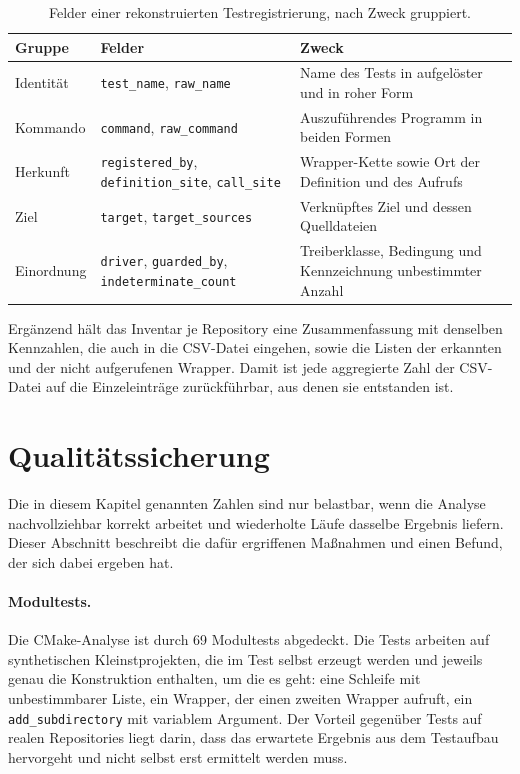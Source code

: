 \documentclass[12pt,a4paper,twoside,headsepline,parskip=half]{scrreprt}
\begin{document}
\begin{table}[H]
    \centering
    \small
    \begin{tabularx}{\textwidth}{l l X}
        \toprule
        \textbf{Gruppe} & \textbf{Felder} & \textbf{Zweck} \\
        \midrule
        Identität & \texttt{test\_name}, \texttt{raw\_name}
            & Name des Tests in aufgelöster und in roher Form \\
        Kommando & \texttt{command}, \texttt{raw\_command}
            & Auszuführendes Programm in beiden Formen \\
        Herkunft & \texttt{registered\_by}, \texttt{definition\_site},
                   \texttt{call\_site}
            & Wrapper-Kette sowie Ort der Definition und des Aufrufs \\
        Ziel & \texttt{target}, \texttt{target\_sources}
            & Verknüpftes Ziel und dessen Quelldateien \\
        Einordnung & \texttt{driver}, \texttt{guarded\_by},
                     \texttt{indeterminate\_count}
            & Treiberklasse, Bedingung und Kennzeichnung unbestimmter Anzahl \\
        \bottomrule
    \end{tabularx}
    \caption{Felder einer rekonstruierten Testregistrierung, nach Zweck gruppiert.}
    \label{tab:impl-datenmodell}
\end{table}

Ergänzend hält das Inventar je Repository eine Zusammenfassung mit denselben
Kennzahlen, die auch in die CSV-Datei eingehen, sowie die Listen der erkannten und der
nicht aufgerufenen Wrapper. Damit ist jede aggregierte Zahl der CSV-Datei auf die
Einzeleinträge zurückführbar, aus denen sie entstanden ist.

\label{sec:impl-ergebnis}
\section{Qualitätssicherung}
\label{sec:impl-qualitaet}

Die in diesem Kapitel genannten Zahlen sind nur belastbar, wenn die Analyse
nachvollziehbar korrekt arbeitet und wiederholte Läufe dasselbe Ergebnis liefern.
Dieser Abschnitt beschreibt die dafür ergriffenen Maßnahmen und einen Befund, der sich
dabei ergeben hat.

\paragraph{Modultests.}
Die CMake-Analyse ist durch 69 Modultests abgedeckt. Die Tests arbeiten auf
synthetischen Kleinstprojekten, die im Test selbst erzeugt werden und jeweils genau
die Konstruktion enthalten, um die es geht: eine Schleife mit unbestimmbarer Liste,
ein Wrapper, der einen zweiten Wrapper aufruft, ein \texttt{add\_subdirectory} mit
variablem Argument. Der Vorteil gegenüber
Tests auf realen Repositories liegt darin, dass das erwartete Ergebnis aus dem
Testaufbau hervorgeht und nicht selbst erst ermittelt werden muss.
\end{document}

